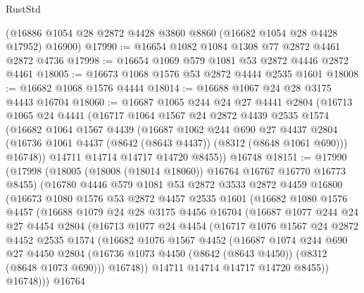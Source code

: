 \begin{lexlean}{RustStd}
\begin{coremodule}
    (@16886 @1054 @28 @2872 @4428 @3860 @8860 (@16682 @1054 @28 @4428 @17952) @16900)
@17990 := @16654 @1082 @1084 @1308 @77 @2872 @4461 @2872 @4736
@17998 := @16654 @1069 @579 @1081 @53 @2872 @4446 @2872 @4461
@18005 := @16673 @1068 @1576 @53 @2872 @4444 @2535 @1601
@18008 := @16682 @1068 @1576 @4444
@18014 := @16688 @1067 @24 @28 @3175 @4443 @16704
@18060 := @16687
    @1065
    @244
    @24
    @27
    @4441
    @2804
    (@16713
      @1065
      @24
      @4441
      (@16717
        @1064
        @1567
        @24
        @2872
        @4439
        @2535
        @1574
        (@16682
          @1064
          @1567
          @4439
          (@16687
            @1062
            @244
            @690
            @27
            @4437
            @2804
            (@16736 @1061 @4437 (@8642 (@8643 @4437)) (@8312 (@8648 @1061 @690)))
            @16748))
        @14711
        @14714
        @14717
        @14720
        @8455))
    @16748
@18151 := @17990
    (@17998
      (@18005 (@18008 (@18014 @18060)) @16764 @16767 @16770 @16773 @8455)
      (@16780
        @4446
        @579
        @1081
        @53
        @2872
        @3533
        @2872
        @4459
        @16800
        (@16673
          @1080
          @1576
          @53
          @2872
          @4457
          @2535
          @1601
          (@16682
            @1080
            @1576
            @4457
            (@16688
              @1079
              @24
              @28
              @3175
              @4456
              @16704
              (@16687
                @1077
                @244
                @24
                @27
                @4454
                @2804
                (@16713
                  @1077
                  @24
                  @4454
                  (@16717
                    @1076
                    @1567
                    @24
                    @2872
                    @4452
                    @2535
                    @1574
                    (@16682
                      @1076
                      @1567
                      @4452
                      (@16687
                        @1074
                        @244
                        @690
                        @27
                        @4450
                        @2804
                        (@16736 @1073 @4450 (@8642 (@8643 @4450)) (@8312 (@8648 @1073 @690)))
                        @16748))
                    @14711
                    @14714
                    @14717
                    @14720
                    @8455))
                @16748)))
          @16764

\end{coremodule}
\end{lexlean}
